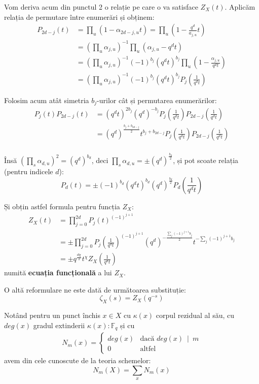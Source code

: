 \documentclass[13pt,openany]{book}
\begin{document}
Vom deriva acum din punctul 2 o relație pe care o va satisface $Z_X(t)$. Aplicăm relația de permutare între enumerări și obținem:
\begin{align*}
P_{2d-j}(t)&=\prod_u(1-\alpha_{2d-j,u}t)=\prod_u(1-\frac{q^d}{a_{j,u}}t)\\
&=(\prod_u \alpha_{j,u})^{-1} \prod_u(\alpha_{j,u}-q^dt)\\
&=(\prod_u \alpha_{j,u})^{-1} (-1)^{b_j} (q^dt)^{b_j} \prod_u (1-\frac{\alpha_{j,u}}{q^dt})\\
&=(\prod_u \alpha_{j,u})^{-1} (-1)^{b_j} (q^dt)^{b_j}P_j(\frac{1}{q^dt})
\end{align*}

Folosim acum atât simetria $b_j$-urilor cât și permutarea enumerărilor:
\begin{align*}
P_j(t)P_{2d-j}(t)&=(q^dt)^{2b_j} (q^d)^{-b_j} P_j(\frac{1}{q^dt}) P_{2d-j}(\frac{1}{q^dt})\\
&=(q^d)^{\frac{b_j+b_{2d-j}}{2}} t^{b_j+b_{2d-j}}P_j(\frac{1}{q^dt}) P_{2d-j}(\frac{1}{q^dt})\\
\end{align*}

Însă $(\prod\limits_s \alpha_{d,u})^2=(q^d)^{b_d}$, deci $\prod\limits_s \alpha_{d,u}=\pm (q^d)^{\frac{b_d}{2}}$, și pot scoate relația (pentru indicele $d$):
$$P_d(t)=\pm (-1)^{b_d} (q^dt)^{b_d} (q^d)^{\frac{b_d}{2}} P_d(\frac{1}{q^dt})$$

Și obțin astfel formula pentru funcția $Z_X$:
\begin{align*}
Z_X(t)&=\prod_{j=0}^{2d} P_j(t)^{(-1)^{j+1}}\\
&=\pm \prod_{j=0}^{2d} P_j(\frac{1}{q^dt})^{(-1)^{j+1}} (q^d)^{-\frac{\sum\limits_j (-1)^{j+1} b_j}{2}} t^{-\sum\limits_j (-1)^{j+1} b_j}\\
&=\pm q^{\frac{d\chi}{2}} t^{\chi} Z_X(\frac{1}{q^dt})
\end{align*}
numită {\bf ecuația funcțională} a lui $Z_X$.

O altă reformulare ne este dată de următoarea substituție:
$$\zeta_X(s)=Z_X(q^{-s})$$

Notând pentru un punct închis $x \in X$ cu $\kappa(x)$ corpul rezidual al său, cu $deg(x)$ gradul extinderii $\kappa(x) : \mathbb{F}_q$ și cu
\begin{align*}
N_m(x) = \left\{
     \begin{array}{lr}
       deg(x) & \text{dacă } deg(x)\ \mid \ m\\
       0 & \text{altfel}
     \end{array}
   \right.
\end{align*}
avem din cele cunoscute de la teoria schemelor:
$$N_m(X)=\sum\limits_x N_m(x)$$
\end{document}
